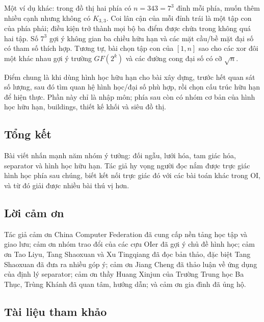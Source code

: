 \documentclass[11pt]{article}
\begin{document}
Một ví dụ khác: trong đồ thị hai phía có $n=343=7^3$ đỉnh mỗi phía, muốn thêm
nhiều cạnh nhưng không có $K_{3,3}$. Coi lân cận của mỗi đỉnh trái là một tập
con của phía phải; điều kiện trở thành mọi bộ ba điểm được chứa trong không quá
hai tập. Số $7^3$ gợi ý không gian ba chiều hữu hạn và các mặt cầu/bề mặt đại
số có tham số thích hợp. Tương tự, bài chọn tập con của $[1,n]$ sao cho các xor
đôi một khác nhau gợi ý trường $GF(2^k)$ và các đường cong đại số có cỡ
$\sqrt n$.

Điểm chung là khi dùng hình học hữu hạn cho bài xây dựng, trước hết quan sát số
lượng, sau đó tìm quan hệ hình học/đại số phù hợp, rồi chọn cấu trúc hữu hạn
để hiện thực. Phần này chỉ là nhập môn; phía sau còn có nhóm cơ bản của hình
học hữu hạn, buildings, thiết kế khối và siêu đồ thị.

\subsection{Tổng kết}

Bài viết nhấn mạnh năm nhóm ý tưởng: đối ngẫu, lưới hóa, tam giác hóa,
separator và hình học hữu hạn. Tác giả hy vọng người đọc nắm được trực giác
hình học phía sau chúng, biết kết nối trực giác đó với các bài toán khác trong
OI, và từ đó giải được nhiều bài thú vị hơn.

\subsection{Lời cảm ơn}

Tác giả cảm ơn China Computer Federation đã cung cấp nền tảng học tập và giao
lưu; cảm ơn nhóm trao đổi của các cựu OIer đã gợi ý chủ đề hình học; cảm ơn Tao
Liyu, Tang Shaoxuan và Xu Tingqiang đã đọc bản thảo, đặc biệt Tang Shaoxuan đã
đưa ra nhiều góp ý; cảm ơn Jiang Cheng đã thảo luận về ứng dụng của định lý
separator; cảm ơn thầy Huang Xinjun của Trường Trung học Ba Thục, Trùng Khánh
đã quan tâm, hướng dẫn; và cảm ơn gia đình đã ủng hộ.

\subsection{Tài liệu tham khảo}
\end{document}
